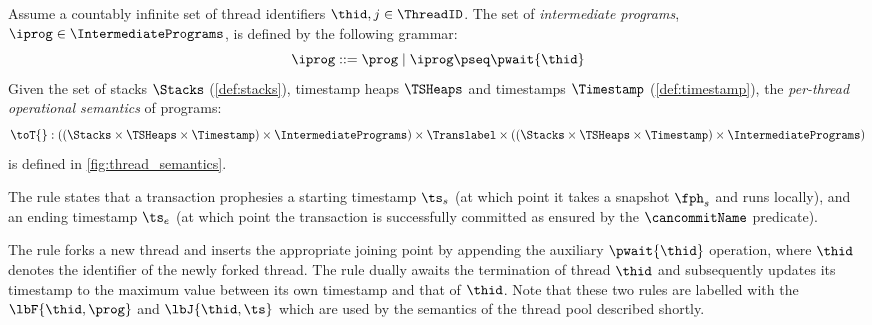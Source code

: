\begin{defn}
\label{def:thread_semantics}
Assume a countably infinite set of thread identifiers $\thid,j \in \ThreadID$.
The set of \emph{intermediate programs}, $\iprog \in \IntermediatePrograms$, is defined by the following grammar:
%
\[
    \iprog ::= \prog \mid \iprog \pseq \pwait{\thid}
\]
%
Given the set of stacks $\Stacks$ (\ref{def:stacks}), timestamp heaps $\TSHeaps$ and timestamps $\Timestamp$ (\ref{def:timestamp}), the \emph{per-thread operational semantics} of programs:
%
\[
	\toT{} : 
	\left((\Stacks \times \TSHeaps \times \Timestamp) \times \IntermediatePrograms \right) 
	\times \Translabel \times  
	\left((\Stacks \times \TSHeaps \times \Timestamp) \times \IntermediatePrograms \right) 
\]
%
is defined in \fig\ref{fig:thread_semantics}.
\end{defn}

The  rule states that a transaction prophesies a starting timestamp $\ts_s$ (at which point it takes a snapshot $\fph_s$ and runs locally), and an ending timestamp $\ts_e$ (at which point the transaction is successfully committed as ensured by the $\cancommitName$ predicate).

The  rule forks a new thread and inserts the appropriate joining point by appending the auxiliary \( \pwait{\thid} \) operation, where $\thid$ denotes the identifier of the newly forked thread. 
The  rule dually awaits the termination of thread $\thid$ and subsequently updates its timestamp to the maximum value between its own timestamp and that of $\thid$.
Note that these two rules are labelled with the $\lbF{\thid, \prog}$ and $\lbJ{\thid, \ts}$ which are used by the semantics of the thread pool described shortly.


